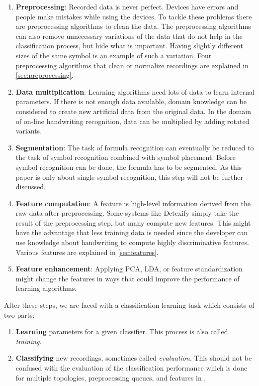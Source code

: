 \documentclass[9pt,technote]{IEEEtran}
\begin{document}
\begin{enumerate}
    \item \textbf{Preprocessing}: Recorded data is never perfect. Devices have
          errors and people make mistakes while using the devices. To tackle
          these problems there are preprocessing algorithms to clean the data.
          The preprocessing algorithms can also remove unnecessary variations
          of the data that do not help in the classification process, but hide
          what is important. Having slightly different sizes of the same symbol
          is an example of such a variation. Four preprocessing algorithms that
          clean or normalize recordings are explained in
          \cref{sec:preprocessing}.
    \item \textbf{Data multiplication}: Learning algorithms need lots of data
          to learn internal parameters. If there is not enough data available,
          domain knowledge can be considered to create new artificial data from
          the original data. In the domain of on-line handwriting recognition,
          data can be multiplied by adding rotated variants.
    \item \textbf{Segmentation}: The task of formula recognition can eventually
          be reduced to the task of symbol recognition combined with symbol
          placement. Before symbol recognition can be done, the formula has
          to be segmented. As this paper is only about single-symbol
          recognition, this step will not be further discussed.
    \item \textbf{Feature computation}: A feature is high-level information
          derived from the raw data after preprocessing. Some systems like
          Detexify simply take the result of the preprocessing step, but many
          compute new features. This might have the advantage that less
          training data is needed since the developer can use knowledge about
          handwriting to compute highly discriminative features. Various
          features are explained in \cref{sec:features}.
    \item \textbf{Feature enhancement}: Applying PCA, LDA, or
          feature standardization might change the features in ways that could
          improve the performance of learning algorithms.
\end{enumerate}

After these steps, we are faced with a classification learning task which
consists of two parts:
\begin{enumerate}
    \item \textbf{Learning} parameters for a given classifier. This process is
          also called \textit{training}.
    \item \textbf{Classifying} new recordings, sometimes called
          \textit{evaluation}. This should not be confused with the evaluation
          of the classification performance which is done for multiple
          topologies, preprocessing queues, and features in
          .
\end{enumerate}
\end{document}
